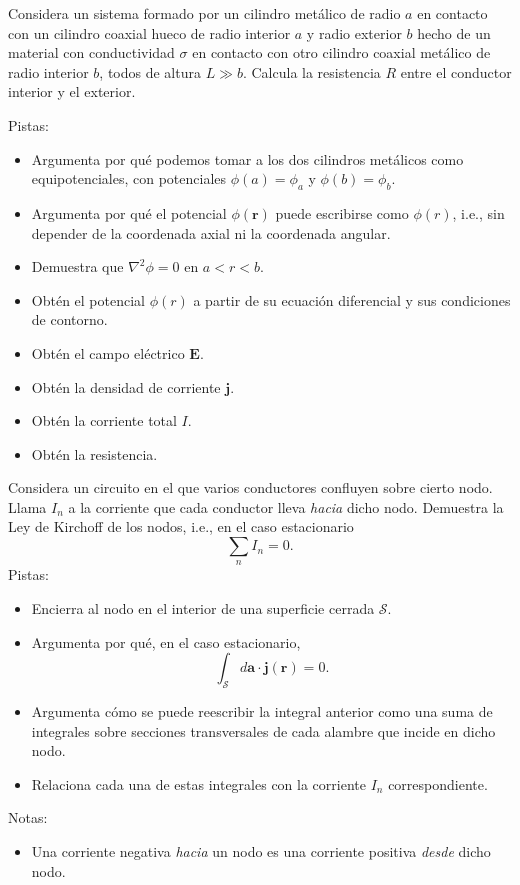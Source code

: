 \documentclass{exam}
\begin{document}
\begin{questions}
  \question Considera un sistema formado por un cilindro metálico de
  radio $a$ en contacto con un cilindro coaxial
  hueco de radio interior $a$ y radio exterior $b$ hecho de un
  material con conductividad $\sigma$ en contacto con
  otro cilindro coaxial metálico de radio interior $b$, todos de
  altura $L\gg b$. Calcula la resistencia $R$ entre el conductor
  interior y el exterior.

  Pistas:
  \begin{itemize}
  \item Argumenta por qué podemos tomar a los dos cilindros metálicos
    como equipotenciales, con potenciales $\phi(a)=\phi_a$ y
    $\phi(b)=\phi_b$.
  \item Argumenta por qué el potencial $\phi(\bm r)$ puede escribirse
    como $\phi(r)$, i.e., sin depender de la coordenada axial ni la
    coordenada angular.
  \item Demuestra que $\nabla^2\phi=0$ en $a<r<b$.
  \item Obtén el potencial $\phi(r)$ a partir de su ecuación
    diferencial y sus condiciones de contorno.
  \item Obtén el campo eléctrico $\bm E$.
  \item Obtén la densidad de corriente $\bm j$.
  \item Obtén la corriente total $I$.
  \item Obtén la resistencia.
  \end{itemize}

  \question  Considera un circuito en el que varios conductores
  confluyen sobre cierto nodo. Llama $I_n$ a la corriente que cada
  conductor lleva {\em hacia} dicho nodo. Demuestra la Ley de Kirchoff
  de los nodos, i.e., en el caso estacionario
  $$
  \sum_n I_n=0.
  $$
  Pistas:
  \begin{itemize}
  \item Encierra al nodo en el interior de una superficie cerrada
    $\mathcal S$.
  \item Argumenta por qué, en el caso estacionario,
    $$
    \int_{\mathcal S} d\bm a\cdot\bm j(\bm r)=0.
    $$
  \item Argumenta cómo se puede reescribir la integral anterior como
    una suma de integrales sobre secciones transversales de cada
    alambre que incide en dicho nodo.
  \item Relaciona cada una de estas integrales con la corriente $I_n$
    correspondiente.
  \end{itemize}
  Notas:
  \begin{itemize}
  \item Una corriente negativa {\em hacia} un nodo es una corriente
    positiva {\em desde} dicho nodo.
  \end{itemize}


\end{questions}
\end{document}
